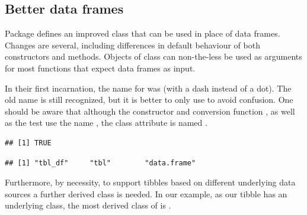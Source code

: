 \documentclass[krantz2]{krantz}\usepackage{knitr}%
\begin{document}
\subsection{Better data frames}

Package  defines an improved class  that can be used in place of data frames. Changes are several, including differences in default behaviour of both constructors and methods. Objects of class  can non-the-less be used as arguments for most functions that expect data frames as input.

\begin{infobox}
In their first incarnation, the name for  was  (with a dash instead of a dot). The old name is still recognized, but it is better to only use  to avoid confusion. One should be aware that although the constructor  and conversion function , as well as the test  use the name , the class attribute is named .

\begin{knitrout}\footnotesize
{}\color{fgcolor}\begin{kframe}
\begin{alltt}
 \hlkwb{<-} \hlstd{(} \hlstd{=} \hlopt{:}\hlstd{)}
\end{alltt}


{\ttfamily\noindent\color{warningcolor}{\#\# Warning: `is.tibble()` is deprecated, use `is\_tibble()`.\\\#\# This warning is displayed once per session.}}\begin{verbatim}
## [1] TRUE
\end{verbatim}
\begin{alltt}
\end{alltt}
\begin{verbatim}
## [1] "tbl_df"     "tbl"        "data.frame"
\end{verbatim}
\end{kframe}
\end{knitrout}

Furthermore, by necessity, to support tibbles based on different underlying data sources a further derived class is needed. In our example, as our tibble has an underlying  class, the most derived class of  is .
\end{infobox}
\end{document}
